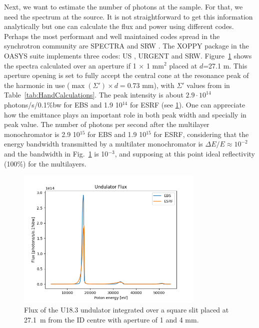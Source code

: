 \documentclass{iucr}              %
\begin{document}
Next, we want to estimate the number of photons at the sample. For that, we need the spectrum at the source. It is not straightforward to get this information analytically but one can calculate the flux and power using different codes. Perhaps the most performant and well maintained codes spread in the synchrotron community are SPECTRA \cite{codeSPECTRA} and SRW \cite{codeSRW}. The XOPPY package in the OASYS suite implements three codes: US \cite{codeUS}, URGENT \cite{codeURGENT} and SRW. Figure~\ref{fig:FluxU18} shows the spectra calculated over an aperture if 1 $\times$ 1 mm$^2$ placed at $d$=27.1 m. This aperture opening is set to fully accept the central cone at the resonance peak of the harmonic in use ($\max(\Sigma') \times d = 0.73$ mm), with $\Sigma'$ values from in Table~\ref{tab:HandCalculations}. The peak intensity is about  $2.9\cdot10^{14}$ photons/s/0.1{\%}bw for EBS and 1.9 10$^{14}$ for ESRF (see \ref{fig:FluxU18}). One can appreciate how the emittance plays an important role in both peak width and specially in peak value. The number of photons per second after the multilayer monochromator is 2.9 10$^{15}$ for EBS and 1.9 10$^{15}$ for ESRF, considering that the energy bandwidth transmitted by a multilater monochromator is $\Delta E/E \approx 10^{-2}$ and the bandwidth in Fig.~\ref{fig:FluxU18} is 10$^{-3}$, and supposing at this point ideal reflectivity (100\%) for the multilayers. 

\begin{figure}\label{fig:FluxU18}
    \centering
    \includegraphics[width=0.8\textwidth]{GRAPHICS/fluxU18.png}
    \caption{Flux of the U18.3 undulator integrated over a square slit placed at 27.1~m from the ID centre with aperture of 1 and 4 mm.}
\end{figure}
\end{document}
